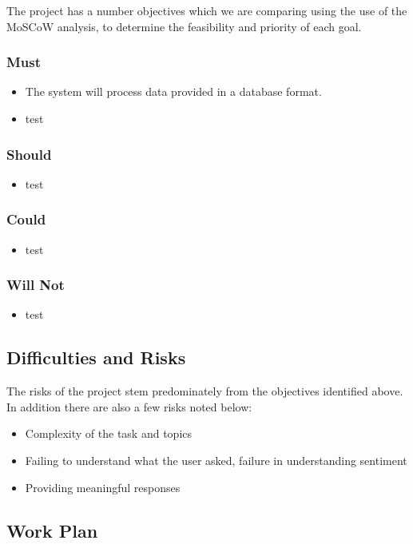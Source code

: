 \documentclass[11pt]{cmpreport}
\begin{document}
The project has a number objectives which we are comparing using the use of the MoSCoW analysis, to determine the feasibility and priority of each goal.

\subsubsection{Must}
\begin{itemize}
\item The system will process data provided in a database format.
\item test
\end{itemize}
\subsubsection{Should}
\begin{itemize}
\item test
\end{itemize}
\subsubsection{Could}
\begin{itemize}
\item test
\end{itemize}
\subsubsection{Will Not}
\begin{itemize}
\item test
\end{itemize}
\subsection{Difficulties and Risks}
The risks of the project stem predominately from the objectives identified above. In addition there are also a few risks noted below: 
\begin{itemize}
    \item Complexity of the task and topics 
    \item Failing to understand what the user asked, failure in understanding sentiment
    \item Providing meaningful responses
\end{itemize}

\subsection{Work Plan}
\end{document}
